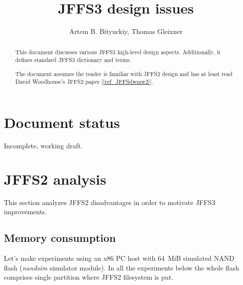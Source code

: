 \documentclass[12pt,a4paper,oneside,titlepage]{article}
\begin{document}
%
%
\title{JFFS3 design issues}
\author{Artem B. Bityuckiy, Thomas Gleixner}
\maketitle

%
%
\pagestyle{empty}
\begin{abstract}
This document discusses various JFFS3 high-level design aspects.
Additionally, it defines standard JFFS3 dictionary and terms.

The document assumes the reader is familiar with JFFS2 design and has at
least read David Woodhouse's JFFS2 paper [\ref{ref_JFFSdwmw2}].
\end{abstract}

%
%
\tableofcontents
\newpage

\pagestyle{plain}

\section*{Document status}
Incomplete, working draft.

%
%
\section{JFFS2 analysis}
This section analyzes JFFS2 disadvantages in order to motivate JFFS3
improvements. 

%
%
\subsection{Memory consumption}
Let's make experiments using an x86 PC host with 64~MiB simulated
NAND flash (\emph{nandsim} simulator module). In all the experiments below the whole
flash comprises single partition where JFFS2 filesystem is put.
\end{document}
